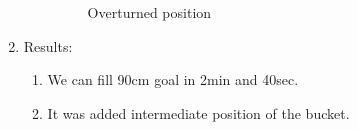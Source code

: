 \begin{enumerate}
\begin{enumerate}
\begin{figure}[H]
\begin{minipage}[h]{0.31\linewidth}
	  	   	\caption{Overturned position}
	  	  \end{minipage}
	   \end{figure}

	\end{enumerate}
	
	\item Results:
	\begin{enumerate}
		
		\item We can fill 90cm goal in 2min and 40sec.
		
		\item It was added intermediate position of the bucket.
		
	\end{enumerate}
	

\end{enumerate}

